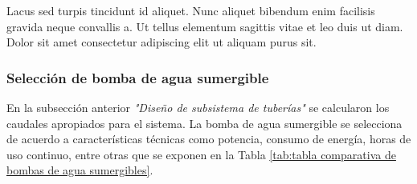 \begin{itemize}
	Lacus sed turpis tincidunt id aliquet. Nunc aliquet bibendum enim facilisis gravida neque convallis a. Ut tellus elementum sagittis vitae et leo duis ut diam. Dolor sit amet consectetur adipiscing elit ut aliquam purus sit. 
	
	
\end{itemize}

\subsubsection{Selección de bomba de agua sumergible}


En la subsección anterior \textit{"Diseño de subsistema de tuberías"} se calcularon los caudales apropiados para el sistema. La bomba de agua sumergible se selecciona de acuerdo a características técnicas como potencia, consumo de energía, horas de uso continuo, entre otras que se exponen en la Tabla \ref{tab:tabla comparativa de bombas de agua sumergibles}.


